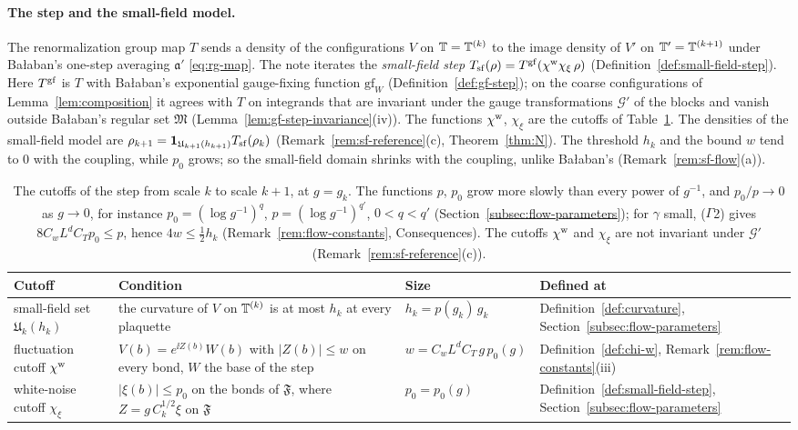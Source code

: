 \paragraph{The step and the small-field model.} The renormalization group map $T$ sends a density of the configurations $V$ on $\mathbb T=\mathbb T^{(k)}$ to the image density of $V'$ on $\mathbb T'=\mathbb T^{(k+1)}$ under Ba\l aban's one-step averaging $\mathfrak a'$ \eqref{eq:rg-map}. The note iterates the \emph{small-field step} $T_{\rm sf}(\rho)=T^{\rm gf}(\chi^{\rm w}\chi_\xi\,\rho)$ (Definition~\ref{def:small-field-step}). Here $T^{\rm gf}$ is $T$ with Ba\l aban's exponential gauge-fixing function $\mathrm{gf}_W$ (Definition~\ref{def:gf-step}); on the coarse configurations of Lemma~\ref{lem:composition} it agrees with $T$ on integrands that are invariant under the gauge transformations $\mathcal G'$ of the blocks and vanish outside Ba\l aban's regular set $\mathfrak M$ (Lemma~\ref{lem:gf-step-invariance}(iv)). The functions $\chi^{\rm w}$, $\chi_\xi$ are the cutoffs of Table~\ref{tab:G-cutoffs}. The densities of the small-field model are $\rho_{k+1}=\mathbf 1_{\mathfrak U_{k+1}(h_{k+1})}T_{\rm sf}(\rho_k)$ (Remark~\ref{rem:sf-reference}(c), Theorem~\ref{thm:N}). The threshold $h_k$ and the bound $w$ tend to $0$ with the coupling, while $p_0$ grows; so the small-field domain shrinks with the coupling, unlike Ba\l aban's (Remark~\ref{rem:sf-flow}(a)).

\begin{table}[tbp]
\centering\small
\renewcommand{\arraystretch}{1.12}
\begin{tabular}{|p{}|p{}|p{}|p{}|}
\hline
Cutoff & Condition & Size & Defined at\tabularnewline
\hline
\raggedright small-field set $\mathfrak U_k(h_k)$ & \raggedright the curvature of $V$ on $\mathbb T^{(k)}$ is at most $h_k$ at every plaquette & \raggedright $h_k=p(g_k)\,g_k$ & \raggedright Definition~\ref{def:curvature}, Section~\ref{subsec:flow-parameters}\tabularnewline
\raggedright fluctuation cutoff $\chi^{\rm w}$ & \raggedright $V(b)=e^{\ii Z(b)}W(b)$ with $|Z(b)|\le w$ on every bond, $W$ the base of the step & \raggedright $w=C_wL^dC_T\,g\,p_0(g)$ & \raggedright Definition~\ref{def:chi-w}, Remark~\ref{rem:flow-constants}(iii)\tabularnewline
\raggedright white-noise cutoff $\chi_\xi$ & \raggedright $|\xi(b)|\le p_0$ on the bonds of $\mathfrak F$, where $Z=g\,C_k^{1/2}\xi$ on $\mathfrak F$ & \raggedright $p_0=p_0(g)$ & \raggedright Definition~\ref{def:small-field-step}, Section~\ref{subsec:flow-parameters}\tabularnewline
\hline
\end{tabular}
\caption{The cutoffs of the step from scale $k$ to scale $k+1$, at $g=g_k$. The functions $p$, $p_0$ grow more slowly than every power of $g^{-1}$, and $p_0/p\to0$ as $g\to0$, for instance $p_0=(\log g^{-1})^q$, $p=(\log g^{-1})^{q'}$, $0<q<q'$ (Section~\ref{subsec:flow-parameters}); for $\gamma$ small, ($\Gamma$2) gives $8C_wL^dC_Tp_0\le p$, hence $4w\le\frac12h_k$ (Remark~\ref{rem:flow-constants}, Consequences). The cutoffs $\chi^{\rm w}$ and $\chi_\xi$ are not invariant under $\mathcal G'$ (Remark~\ref{rem:sf-reference}(c)).}\label{tab:G-cutoffs}
\end{table}

